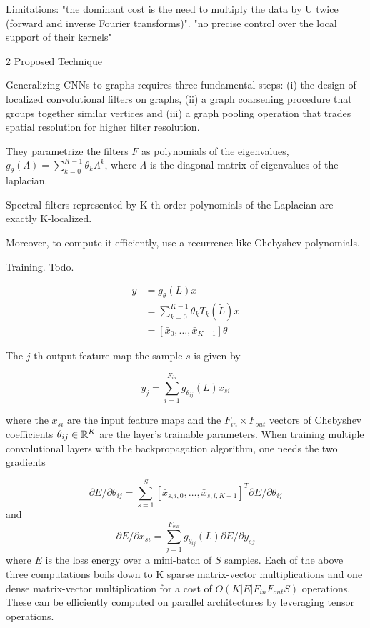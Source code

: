 \documentclass[english]{article}
\begin{document}
\benum 
\item 
Limitations: "the dominant cost is the need
to multiply the data by U twice (forward and inverse Fourier transforms)". "no precise control over the
local support of their kernels"

\item 2 Proposed Technique

Generalizing CNNs to graphs requires three fundamental steps: (i) the design of localized convolutional filters on graphs, (ii) a graph coarsening procedure that groups together similar vertices and
(iii) a graph pooling operation that trades spatial resolution for higher filter resolution.

\item They parametrize the filters $F$ as polynomials of the eigenvalues, $g_\theta(\Lambda) = \sum_{k=0}^{K-1} \theta_k \Lambda^k$, where $\Lambda$ is the diagonal matrix of eigenvalues of the laplacian. 

Spectral filters represented by K-th order polynomials of the Laplacian are exactly K-localized.

\item Moreover, to compute it efficiently, use a recurrence like Chebyshev polynomials. 

\item Training. Todo.

\begin{align*}
y &= g_\theta(L) x\\
&= \sum_{k=0}^{K-1}\theta_k T_k(\tilde L)x\\
&=[\bar x_0, \ldots, \bar x_{K-1}]\theta
\end{align*}


The $j$-th output feature map  the sample $s$ is given by

$$y_j = \sum_{i=1}^{F_{in}} g_{\theta_{ij}}(L) x_{si} $$


where the $x_{si}$ are the input feature maps and the $F_{in} \times F_{out}$ vectors of Chebyshev coefficients $\theta_{ij} \in \mathbb{R}^K$ are the layer's trainable parameters. When training multiple convolutional layers with the backpropagation algorithm, one needs the two gradients

$$
\partial E/\partial{\theta_{ij}}
=
\sum_{s=1}^S
[\bar{x}_{s,i,0} ,\ldots, \bar{x}_{s,i,K-1}]^T
\partial E/\partial{\theta_{ij}}
$$
and 
$$
\partial E/\partial{x_{si}}
=
\sum_{j=1}^{F_{out}}
 g_{\theta_{ij}}(L)
\partial E/\partial{y_{sj}}
$$
where $E$ is the loss energy over a mini-batch of $S$ samples. Each of the above three computations boils down to K sparse matrix-vector multiplications and one dense matrix-vector multiplication for
a cost of $O(K|E|F_{in} F_{out} S)$ operations. These can be efficiently computed on parallel architectures
by leveraging tensor operations.
\end{document}
